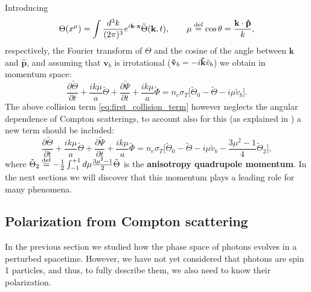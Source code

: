 Introducing 
$$\Theta(x^\mu) = \int \frac{d^3k}{(2\pi)^3}e^{i\mathbf{k}\cdot\mathbf{x}}\tilde\Theta(\mathbf{k},t),\qquad \mu\stackrel{\text{def}}{=} \cos\theta=\frac{\mathbf{k}\cdot\mathbf{\hat{p}}}{k},$$respectively, the Fourier transform of $\Theta$ and the cosine of the angle between $\mathbf{k}$ and $\mathbf{\hat{p}}$, and assuming that $\mathbf{v}_b$ is irrotational ($\mathbf{\tilde v}_b=-i\mathbf{\hat{k}}\tilde v_b$) we obtain in momentum space:
\begin{equation*}
    \frac{\partial \tilde\Theta}{\partial t} +\frac{ik\mu}{a}\tilde\Theta+\frac{\partial \tilde\Psi}{\partial t}+\frac{ik\mu}{a}\tilde\Phi=n_e \sigma_T\Bigg[\tilde\Theta_0-\tilde\Theta-i\mu\tilde v_b\Bigg].
\end{equation*}
The above collision term \eqref{eq:first_collision_term} however neglects the angular dependence of Compton scatterings, to account also for this (as explained in \cite{dodelson}) a new term should be included:
\begin{equation}
    \frac{\partial \tilde\Theta}{\partial t} +\frac{ik\mu}{a}\tilde\Theta+\frac{\partial \tilde\Psi}{\partial t}+\frac{ik\mu}{a}\tilde\Phi=n_e \sigma_T\Bigg[\tilde\Theta_0-\tilde\Theta-i\mu\tilde v_b-\frac{3\mu^2-1}{4}\tilde\Theta_2\Bigg],
\end{equation}
where $\tilde\Theta_2\stackrel{\text{def}}{=} -\frac{1}{2}\int_{-1}^{+1}d\mu\frac{3\mu^2-1}{2}\tilde\Theta$ is the \textbf{anisotropy quadrupole momentum}. In the next sections we will discover that this momentum plays a leading role for many phenomena.
\subsection{Polarization from Compton scattering}\label{sec:ComptonPolarization}
In the previous section we studied how the phase space of photons evolves in a perturbed spacetime. However, we have not yet considered that photons are spin 1 particles, and thus, to fully describe them, we also need to know their polarization.

